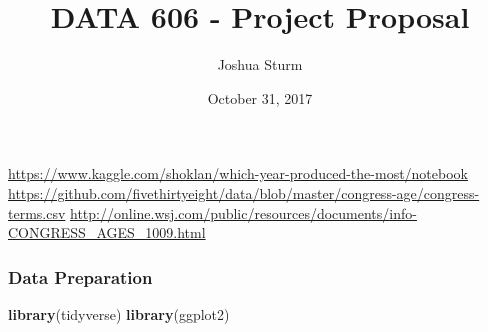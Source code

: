 \documentclass[]{article}
\title{DATA 606 - Project Proposal}
\author{Joshua Sturm}
\date{October 31, 2017}
\newenvironment{Shaded}{\begin{snugshade}}{\end{snugshade}}
\newcommand{\KeywordTok}[1]{\textcolor[rgb]{0.13,0.29,0.53}{\textbf{#1}}}
\newcommand{\NormalTok}[1]{#1}
\begin{document}
\maketitle

\url{https://www.kaggle.com/shoklan/which-year-produced-the-most/notebook}
\url{https://github.com/fivethirtyeight/data/blob/master/congress-age/congress-terms.csv}
\url{http://online.wsj.com/public/resources/documents/info-CONGRESS_AGES_1009.html}

\subsubsection{Data Preparation}\label{data-preparation}

\begin{Shaded}
\begin{Highlighting}[]
\KeywordTok{library}\NormalTok{(tidyverse)}
\KeywordTok{library}\NormalTok{(ggplot2)}
\end{Highlighting}
\end{Shaded}
\end{document}
